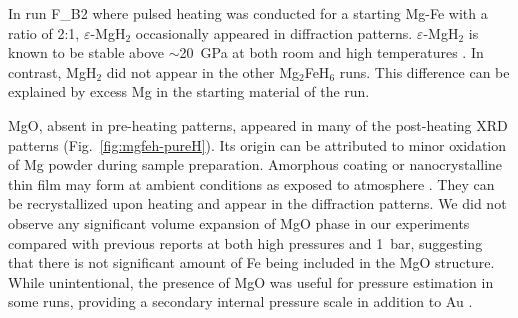 \documentclass[draft,jgrga,12pt]{agujournal2019}
\begin{document}


In run F\_B2 where pulsed heating was conducted for a starting Mg-Fe with a ratio of 2:1, $\varepsilon$-MgH$_2$ occasionally appeared in diffraction patterns.   
$\varepsilon$-MgH$_2$ is known to be stable above $\sim$20~GPa at both room and high temperatures \cite{moriwaki_structural_2006}.  
In contrast, MgH$_2$ did not appear in the other Mg$_2$FeH$_6$ runs. 
This difference can be explained by excess Mg in the starting material of the run.




MgO, absent in pre-heating patterns, appeared in many of the post-heating XRD patterns (Fig.~\ref{fig:mgfeh-pureH}). 
Its origin can be attributed to minor oxidation of Mg powder during sample preparation. 
Amorphous coating or {nanocrystalline} thin film {may form} at ambient conditions as exposed to atmosphere  \cite{mahadeva_magnetism_2013, wang_turning_2018}. 
{They can be} recrystallized upon heating and appear in the diffraction patterns. 
We did not observe {any significant} volume expansion of MgO phase in our experiments compared with previous reports \cite{ye_intercomparison_2017} at both high pressures and {1~bar}, suggesting that there is not significant amount of Fe being included in the MgO structure. 
While unintentional, the presence of MgO was useful for pressure estimation in some runs, providing a secondary internal pressure scale \cite{dorogokupets_equations_2007} in addition to Au \cite{fei_internally_2007}.
\end{document}

